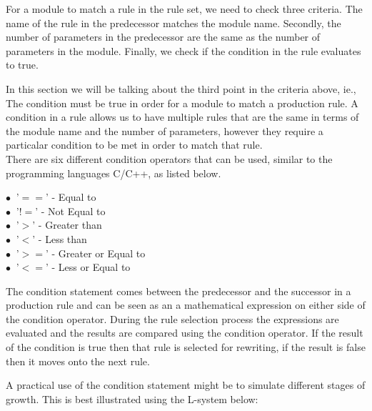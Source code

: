 \begin{flushleft}

For a module to match a rule in the rule set, we need to check three criteria. The name of the rule in the predecessor matches the module name. Secondly, the number of parameters in the predecessor are the same as the number of parameters in the module. Finally, we check if the condition in the rule evaluates to true. \\

\vspace{5mm}

In this section we will be talking about the third point in the criteria above, ie., The condition must be true in order for a module to match a production rule. A condition in a rule allows us to have multiple rules that are the same in terms of the module name and the number of parameters, however they require a particalar condition to be met in order to match that rule. \\
There are six different condition operators that can be used, similar to the programming languages C/C++, as listed below.

\vspace{5mm}

$\bullet~$  '$==$'  - Equal to \\
$\bullet~$  '$!=$' - Not Equal to \\
$\bullet~$  '$>$' - Greater than \\
$\bullet~$  '$<$' - Less than \\
$\bullet~$  '$>=$' - Greater or Equal to \\
$\bullet~$  '$<=$' - Less or Equal to \\

\vspace{5mm}

The condition statement comes between the predecessor and the successor in a production rule and can be seen as an a mathematical expression on either side of the condition operator. During the rule selection process the expressions are evaluated and the results are compared using the condition operator. If the result of the condition is true then that rule is selected for rewriting, if the result is false then it moves onto the next rule. \\

\vspace{5mm}

A practical use of the condition statement might be to simulate different stages of growth. This is best illustrated using the L-system below: \\


\end{flushleft}
